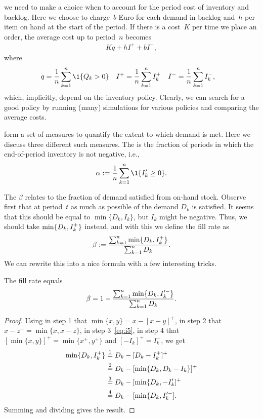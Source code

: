 \documentclass[stochastic-or.tex]{subfiles}
\begin{document}
 we need to make a choice when to account for the period cost of inventory and backlog.
Here we choose to charge~$b$ Euro for each demand in backlog and~$h$ per item on hand at the start of the period.
If there is a cost~$K$ per time we place an order, the average cost up to period~$n$ becomes
\begin{align*}
K q + h I^+ + b I^-,
\end{align*}
where
\begin{align*}
  q&= \frac 1n \sum_{k=1}^n \1{Q_{k}>0}  &
  I^+ &= \frac 1n \sum_{k=1}^n \IL_k^+  &
  I^- &= \frac 1n \sum_{k=1}^n \IL_k^-,
\end{align*}
which, implicitly, depend on the inventory policy.
Clearly, we can search for a good policy by running (many) simulations for various policies and comparing the average costs.

 form a set of  measures to quantify the extent to which demand is met. Here we discuss three different such measures.
The  is the fraction of periods in which the end-of-period inventory is not negative, i.e.,
\begin{equation*}
\alpha :=   \frac 1n \sum_{k=1}^n \1{\IL_k'\geq 0}.
\end{equation*}

The  $\beta$ relates to the fraction of demand satisfied from on-hand stock.
Observe first that at period~$t$ as much as possible of the demand $D_{k}$ is satisfied.
It seems that this should be equal to $\min\{D_{k}, I_{k}\}$, but $I_{k}$ might be negative.
Thus, we should take $\min\{D_{k}, I_{k}^{+}\}$ instead, and with this we define the fill rate as
\begin{equation}\label{eq:c24}
    \beta :=  \frac{\sum_{k=1}^n \min\{D_k, I_k^{+}\}}{\sum_{k=1}^n D_k}.
\end{equation}
We can rewrite this into  a nice formula with a few interesting tricks.

\begin{lemma}\label{lem:4}
The fill rate equals
\begin{equation*}
    \beta = 1 - \frac{\sum_{k=1}^n \min\{D_k, I_k'^-\}}{\sum_{k=1}^n D_k}.
\end{equation*}
\end{lemma}
\begin{proof}
Using in step 1 that $\min\{x, y\} = x - [x-y]^{+}$, in step 2 that  $x - z^{+} = \min\{x, x-z\}$, in step 3~\cref{eq:i5}, in step 4 that $[\min\{x, y\}]^{+} = \min\{x^+, y^{+}\}$ and $[-I_k]^{+} = I_k^{-}$, we get
\begin{align*}
   \min\{D_{k}, I_{k}^{+}\}
  &\stackrel1= D_k - [D_k-I_{k}^{+}]^{+}\\
  &\stackrel2= D_k - [\min\{D_k, D_{k}-I_{k}\}]^{+}\\
  &\stackrel3= D_k - [\min\{D_k, -I_{k}']^{+}\\
  &\stackrel4= D_k - [\min\{D_k, I_{k}'^{-}].
\end{align*}
Summing and dividing gives the result.
\end{proof}
\end{document}
